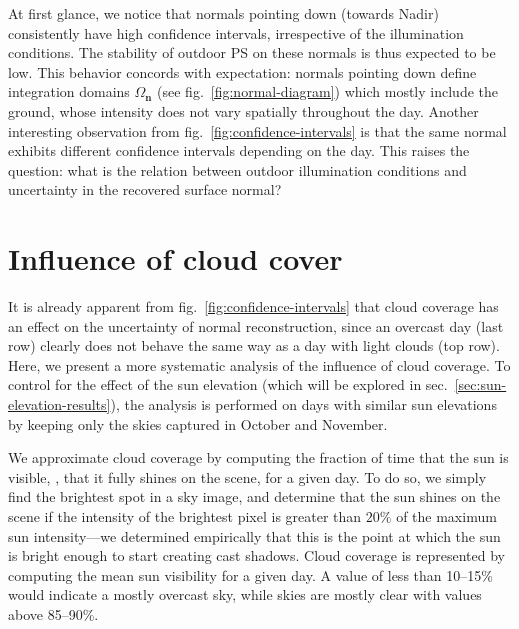 At first glance, we notice that normals pointing down (towards Nadir) consistently have high confidence intervals, irrespective of the illumination conditions. The stability of outdoor PS on these normals is thus expected to be low. This behavior concords with expectation: normals pointing down define integration domains $\Omega_{\mathbf{n}}$ (see fig.~\ref{fig:normal-diagram}) which mostly include the ground, whose intensity does not vary spatially throughout the day. Another interesting observation from fig.~\ref{fig:confidence-intervals} is that the same normal exhibits different confidence intervals depending on the day. This raises the question: what is the relation between outdoor illumination conditions and uncertainty in the recovered surface normal?


\section{Influence of cloud cover}
\label{sec:cloud-cover-results}

It is already apparent from fig.~\ref{fig:confidence-intervals} that cloud coverage has an effect on the uncertainty of normal reconstruction, since an overcast day (last row) clearly does not behave the same way as a day with light clouds (top row). Here, we present a more systematic analysis of the influence of cloud coverage. To control for the effect of the sun elevation (which will be explored in sec.~\ref{sec:sun-elevation-results}), the analysis is performed on days with similar sun elevations by keeping only the skies captured in October and November.

We approximate cloud coverage by computing the fraction of time that the sun is visible, \ie, that it fully shines on the scene, for a given day. To do so, we simply find the brightest spot in a sky image, and determine that the sun shines on the scene if the intensity of the brightest pixel is greater than $20\%$ of the maximum sun intensity---we determined empirically that this is the point at which the sun is bright enough to start creating cast shadows. Cloud coverage is represented by computing the mean sun visibility for a given day. A value of less than 10--15\% would indicate a mostly overcast sky, while skies are mostly clear with values above 85--90\%.

